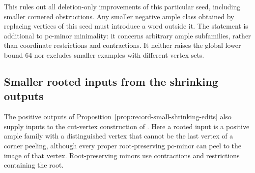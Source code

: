 \documentclass[11pt]{article}
\numberwithin{equation}{section}
\theoremstyle{definition}
\theoremstyle{remark}
\begin{document}
This rules out all deletion-only improvements of this particular seed,
including smaller cornered obstructions. Any smaller negative ample class
obtained by replacing vertices of this seed must introduce a word outside
it. The statement is additional to pc-minor minimality: it concerns
arbitrary ample subfamilies, rather than coordinate restrictions and
contractions. It neither raises the global lower bound $64$ nor excludes
smaller examples with different vertex sets.

\subsection{Smaller rooted inputs from the shrinking outputs}
\label{sec:shrinking-rooted-inputs}

The positive outputs of Proposition~\ref{prop:record-small-shrinking-edits}
also supply inputs to the cut-vertex construction of
\cite{BousquetDampReader}.  Here a rooted input is a positive ample family
with a distinguished vertex that cannot be the last vertex of a corner
peeling, although every proper root-preserving pc-minor can peel to the
image of that vertex. Root-preserving minors use contractions and
restrictions containing the root.
\end{document}
